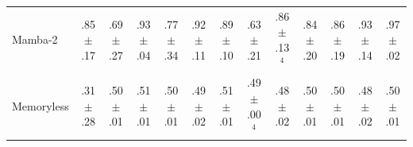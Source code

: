 \begin{table}[t]
\begin{tabular}{@{}l ccc ccc ccc ccc@{}}
Mamba-2 & .85{\scriptsize$\pm$.17} & .69{\scriptsize$\pm$.27} & .93{\scriptsize$\pm$.04} & .77{\scriptsize$\pm$.34} & .92{\scriptsize$\pm$.11} & .89{\scriptsize$\pm$.10} & .63{\scriptsize$\pm$.21} & .86{\scriptsize$\pm$.13}$^{4}$ & .84{\scriptsize$\pm$.20} & .86{\scriptsize$\pm$.19} & .93{\scriptsize$\pm$.14} & .97{\scriptsize$\pm$.02} \\
Memoryless & .31{\scriptsize$\pm$.28} & .50{\scriptsize$\pm$.01} & .51{\scriptsize$\pm$.01} & .50{\scriptsize$\pm$.01} & .49{\scriptsize$\pm$.02} & .51{\scriptsize$\pm$.01} & .49{\scriptsize$\pm$.00}$^{4}$ & .48{\scriptsize$\pm$.02} & .50{\scriptsize$\pm$.01} & .50{\scriptsize$\pm$.01} & .48{\scriptsize$\pm$.02} & .50{\scriptsize$\pm$.01} \\
\bottomrule\end{tabular}\end{table}


